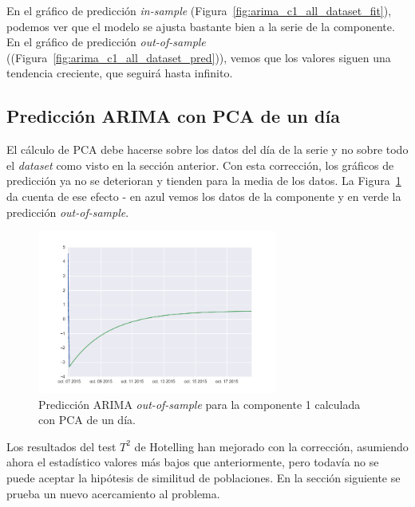 \documentclass[11pt,spanish,listoffigures,listoftables]{tfgetsinf}
\begin{document}
        En el gráfico de predicción {\em in-sample} (Figura~\ref{fig:arima_c1_all_dataset_fit}), podemos ver que el modelo se ajusta bastante bien a la serie de la componente. En el gráfico de predicción {\em out-of-sample} ((Figura~\ref{fig:arima_c1_all_dataset_pred})), vemos que los valores siguen una tendencia creciente, que seguirá hasta infinito. 
        
        \subsection{Predicción ARIMA con PCA de un día}
        El cálculo de PCA debe hacerse sobre los datos del día de la serie y no sobre todo el {\em dataset} como visto en la sección anterior. Con esta corrección, los gráficos de predicción ya no se deterioran y tienden para la media de los datos. La  Figura~\ref{fig:arima_c1_one_day_pred} da cuenta de ese efecto - en azul vemos los datos de la componente y en verde la predicción {\em out-of-sample}.
        
        \begin{figure}[H]
            \centering
            \includegraphics[width=0.7\textwidth]{arima_c1_one_day_pred.png}
            \caption{Predicción ARIMA {\em out-of-sample} para la componente 1 calculada con PCA de un día.}
            \label{fig:arima_c1_one_day_pred}
        \end{figure}
        
        Los resultados del test \(T^2\) de Hotelling han mejorado con la corrección, asumiendo ahora el estadístico valores más bajos que anteriormente, pero todavía no se puede aceptar la hipótesis de similitud de poblaciones. En la sección siguiente se prueba un nuevo acercamiento al problema.
\end{document}
